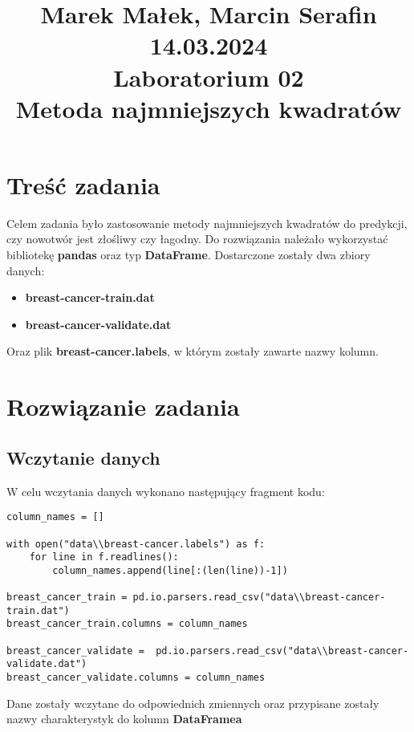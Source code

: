\documentclass{article}
\title{
    Marek Małek, Marcin Serafin 14.03.2024 \\ 
    \Large Laboratorium 02 \\
    Metoda najmniejszych kwadratów
    }
\date{\vspace{-5ex}}
\begin{document}
\maketitle

\section{Treść zadania}
Celem zadania było zastosowanie metody najmniejszych kwadratów do predykcji, czy nowotwór jest złośliwy czy łagodny. Do rozwiązania należało wykorzystać bibliotekę \textbf{pandas} oraz typ \textbf{DataFrame}. Dostarczone zostały dwa zbiory danych:
\begin{itemize}
    \item \textbf{breast-cancer-train.dat}
    \item \textbf{breast-cancer-validate.dat}
\end{itemize}
Oraz plik \textbf{breast-cancer.labels}, w którym zostały zawarte nazwy kolumn.

\section{Rozwiązanie zadania}

\subsection{Wczytanie danych}

W celu wczytania danych wykonano następujący fragment kodu:
\begin{lstlisting}
column_names = []

with open("data\\breast-cancer.labels") as f:
    for line in f.readlines():
        column_names.append(line[:(len(line))-1])

breast_cancer_train = pd.io.parsers.read_csv("data\\breast-cancer-train.dat")
breast_cancer_train.columns = column_names

breast_cancer_validate =  pd.io.parsers.read_csv("data\\breast-cancer-validate.dat")
breast_cancer_validate.columns = column_names

\end{lstlisting}

Dane zostały wczytane do odpowiednich zmiennych oraz przypisane zostały nazwy charakterystyk do kolumn \textbf{DataFramea}

\pagebreak
\end{document}
